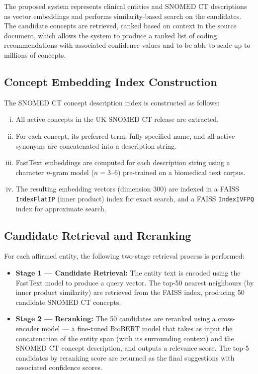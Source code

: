 The proposed system represents clinical entities and SNOMED CT descriptions as vector embeddings and performs similarity-based search on the candidates. The candidate concepts are retrieved, ranked based on context in the source document, which allows the system to produce a ranked list of coding recommendations with associated confidence values and to be able to scale up to millions of concepts.

\subsection{Concept Embedding Index Construction}
The SNOMED CT concept description index is constructed as follows:
\begin{enumerate}[(i)]
    \item All active concepts in the UK SNOMED CT release are extracted.
    \item For each concept, its preferred term, fully specified name, and all active synonyms are concatenated into a description string.
    \item FastText embeddings are computed for each description string using a character $n$-gram model ($n = 3$--$6$) pre-trained on a biomedical text corpus.
    \item The resulting embedding vectors (dimension 300) are indexed in a FAISS \texttt{IndexFlatIP} (inner product) index for exact search, and a FAISS \texttt{IndexIVFPQ} index for approximate search.
\end{enumerate}

\subsection{Candidate Retrieval and Reranking}
For each affirmed entity, the following two-stage retrieval process is performed:
\begin{itemize}
    \item \textbf{Stage 1 --- Candidate Retrieval:} The entity text is encoded using the FastText model to produce a query vector. The top-50 nearest neighbours (by inner product similarity) are retrieved from the FAISS index, producing 50 candidate SNOMED CT concepts.
    \item \textbf{Stage 2 --- Reranking:} The 50 candidates are reranked using a cross-encoder model --- a fine-tuned BioBERT model that takes as input the concatenation of the entity span (with its surrounding context) and the SNOMED CT concept description, and outputs a relevance score. The top-5 candidates by reranking score are returned as the final suggestions with associated confidence scores.
\end{itemize}

